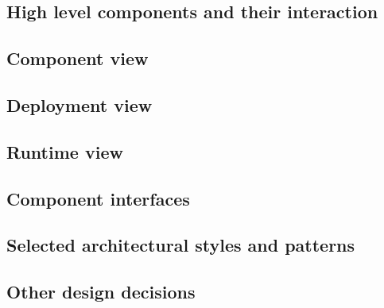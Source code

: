 \documentclass[18pt,oneside,a4paper, titlepage]{article}
\begin{document}
		\subsection{High level components and their interaction}
		\subsection{Component view}
		
		\subsection{Deployment view}
		\subsection{Runtime view}
		\subsection{Component interfaces}
		\subsection{Selected architectural styles and patterns}
			
		\subsection{Other design decisions}
		
\end{document}

